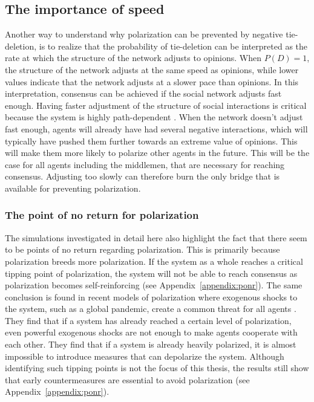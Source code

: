 \documentclass[11pt]{article}
\begin{document}
\subsection{The importance of speed}
\noindent Another way to understand why polarization can be prevented by negative tie-deletion, is to realize that the probability of tie-deletion can be interpreted as the rate at which the structure of the network adjusts to opinions. When $P(D) = 1$, the structure of the network adjusts at the same speed as opinions, while lower values indicate that the network adjusts at a slower pace than opinions. In this interpretation, consensus can be achieved if the social network adjusts fast enough. Having faster adjustment of the structure of social interactions is critical because the system is highly path-dependent \cite{turner_paths_2018, macy2021polarization}.  When the network doesn't adjust fast enough, agents will already have had several negative interactions, which will typically have pushed them further towards an extreme value of opinions. This will make them more likely to polarize other agents in the future. This will be the case for all agents including the middlemen, that are necessary for reaching consensus. Adjusting too slowly can therefore burn the only bridge that is available for preventing polarization.  

\subsubsection{The point of no return for polarization}
The simulations investigated in detail here also highlight the fact that there seem to be points of no return regarding polarization. This is primarily because polarization breeds more polarization. If the system as a whole reaches a critical tipping point of polarization, the system will not be able to reach consensus as polarization becomes self-reinforcing (see Appendix~\ref{appendix:ponr}). The same conclusion is found in recent models of polarization where exogenous shocks to the system, such as a global pandemic, create a common threat for all agents \cite{macy2021polarization, levin_dynamics_2021}. They find that if a system has already reached a certain level of polarization, even powerful exogenous shocks are not enough to make agents cooperate with each other. They find that if a system is already heavily polarized, it is almost impossible to introduce measures that can depolarize the system. Although identifying such tipping points is not the focus of this thesis, the results still show that early countermeasures are essential to avoid polarization (see Appendix~\ref{appendix:ponr}).
\end{document}
